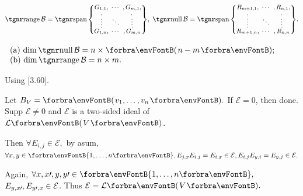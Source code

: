 $\range\mathcal{B}=\Spn{\small\begin{Bmatrix} \underset{\;,}{G_{1,1}}, &\hspace{-6pt} \cdots &\hspace{-6pt} ,\underset{\!\!,}{G_{m,1}},\\[-2pt] \vdots &\hspace{-6pt} \ddots &\hspace{-6pt} \vdots\\[-2pt] \overset{\;,}{G_{1,n}}, &\hspace{-6pt} \cdots &\hspace{-6pt} ,\overset{\!\!\!,}{G_{m,n}}\end{Bmatrix}},\;\null\mathcal{B}=\Spn{\small\begin{Bmatrix} \underset{\;,}{R_{m+1,1}}, &\hspace{-6pt} \cdots &\hspace{-6pt} ,\underset{\!\!,}{R_{n,1}},\\[-2pt] \vdots &\hspace{-6pt} \ddots &\hspace{-6pt} \vdots\\[-2pt] \overset{\;,}{R_{m+1,n}}, &\hspace{-6pt} \cdots &\hspace{-6pt} ,\overset{\!\!\!,}{R_{n,n}}\end{Bmatrix}}.$
\;\;$\hText{\\$
(a) $\dim\null \mathcal{B}=n\times\Par{n-m};\\$
(b) $\dim\range \mathcal{B}=n\times m.}$\par\PfEnd[-12pt]\vspace{-6pt}
\SepLine

 \;Using {\NOTEFOR} [3.60].\par\quad
Let $B_V=\Par{v_1,\dots,v_n}.$ If $\mathcal{E}=0$, then done. Supp $\mathcal{E}\neq 0$ and $\mathcal{E}$ is a two-sided ideal of $\Lm{V}$.\vspace{3pt}\par\quad
Then {\FontLarge$\forall E_{i,j}\in\mathcal{E},$} by asum, {\FontLarge\vspace{3pt}$\forall x,y\in\Bra{1,\dots,n},E_{j,x}E_{i,j}=E_{i,x}\in\mathcal{E},E_{i,j}E_{y,i}=E_{y,j}\in\mathcal{E}.$}\par\quad
Again, $\forall x,x\apostrophe,y,y\apostrophe\in\Bra{1,\dots,n},$\;\,{\FontLarge$E_{y,x\prime},E_{y\prime,x}\in\mathcal{E}$}. Thus $\mathcal{E}=\Lm{V}.$\PfEnd
\SepLine


